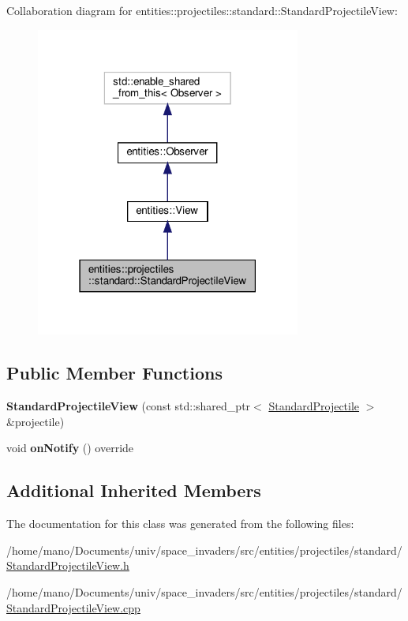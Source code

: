 Collaboration diagram for entities\+:\+:projectiles\+:\+:standard\+:\+:Standard\+Projectile\+View\+:\nopagebreak
\begin{figure}[H]
\begin{center}
\leavevmode
\includegraphics[width=247pt]{classentities_1_1projectiles_1_1standard_1_1StandardProjectileView__coll__graph}
\end{center}
\end{figure}
\subsection*{Public Member Functions}
\begin{DoxyCompactItemize}
\item 
\mbox{\label{classentities_1_1projectiles_1_1standard_1_1StandardProjectileView_a93bc0e6f5a422406185e4d99b2e0f83e}} 
{\bfseries Standard\+Projectile\+View} (const std\+::shared\+\_\+ptr$<$ \hyperlink{classentities_1_1projectiles_1_1standard_1_1StandardProjectile}{Standard\+Projectile} $>$ \&projectile)
\item 
\mbox{\label{classentities_1_1projectiles_1_1standard_1_1StandardProjectileView_a8afdc8dc0deace3a76b1b43ca0e1b251}} 
void {\bfseries on\+Notify} () override
\end{DoxyCompactItemize}
\subsection*{Additional Inherited Members}


The documentation for this class was generated from the following files\+:\begin{DoxyCompactItemize}
\item 
/home/mano/\+Documents/univ/space\+\_\+invaders/src/entities/projectiles/standard/\hyperlink{StandardProjectileView_8h}{Standard\+Projectile\+View.\+h}\item 
/home/mano/\+Documents/univ/space\+\_\+invaders/src/entities/projectiles/standard/\hyperlink{StandardProjectileView_8cpp}{Standard\+Projectile\+View.\+cpp}\end{DoxyCompactItemize}
